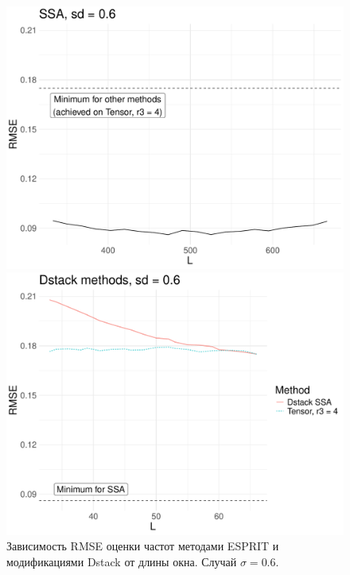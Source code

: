 \documentclass[specialist,
  substylefile=spbu_report.rtx,
subf,href,colorlinks=true, 12pt]{disser}
\theoremstyle{plain}
\theoremstyle{definition}
\theoremstyle{remark}
\begin{document}
\begin{figure}
  \begin{minipage}{0.48\textwidth}
    \centering
    \includegraphics[width=\textwidth]{htlsd_byL_real_rec_rmse_ssa_3.pdf}
  \end{minipage}
  \begin{minipage}{0.48\textwidth}
    \centering
    \includegraphics[width=\textwidth]{htlsd_byL_real_rec_rmse_dstack_3.pdf}
  \end{minipage}
  \caption{Зависимость RMSE оценки частот методами ESPRIT и
  модификациями Dstack от длины окна. Случай $\sigma = 0.6$.}
  \label{fig:dstack-ssa-byL-large}
\end{figure}
\end{document}
